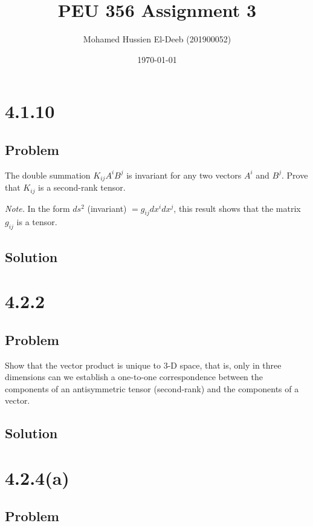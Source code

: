 \documentclass[12pt]{article}
\title{PEU 356 Assignment 3}
\author{Mohamed Hussien El-Deeb (201900052)}
\date{\today}
\begin{document}
\maketitle
\tableofcontents
\hypersetup{linkcolor=RoyalBlue4}

\newpage
\section{4.1.10}

\subsection{Problem}

The double summation \( K_{ij} A^i B^j \) is invariant for any two vectors \( A^i \) and \( B^j \). Prove that \( K_{ij} \) is a second-rank tensor.

\textit{Note.} In the form \( ds^2 \) (invariant) \( = g_{ij} dx^i dx^j \), this result shows that the matrix \( g_{ij} \) is a tensor.

\subsection{Solution}

\newpage
\section{4.2.2}

\subsection{Problem}

Show that the vector product is unique to 3-D space, that is, only in three dimensions can
we establish a one-to-one correspondence between the components of an antisymmetric
tensor (second-rank) and the components of a vector.

\subsection{Solution}

\newpage
\section{4.2.4(a)}

\subsection{Problem}
\end{document}
